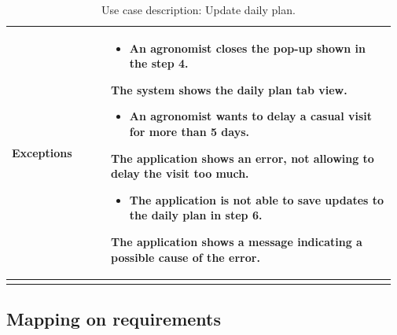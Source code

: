 \begin{longtable}{@{}p{0.25\linewidth} p{0.72\linewidth}@{}}
	\textbf{Exceptions}         & \begin{itemize}[leftmargin=.4cm,noitemsep,topsep=0pt,before=\vspace{-3mm}]
	   \item An agronomist closes the pop-up shown in the step 4.
	\end{itemize}
    The system shows the daily plan tab view. \begin{itemize}[leftmargin=.4cm,noitemsep,topsep=0pt]
	   \item An agronomist wants to delay a casual visit for more than 5 days.
	\end{itemize}
	The application shows an error, not allowing to delay the visit too much.
    \begin{itemize}[leftmargin=.4cm,noitemsep,topsep=0pt]
	   \item The application is not able to save updates to the daily plan in step 6. 
	\end{itemize}
	The application shows a message indicating a possible cause of the error.
	\\\bottomrule
	\caption{Use case description: Update daily plan.} 
\end{longtable}

\subsection{Mapping on requirements}


